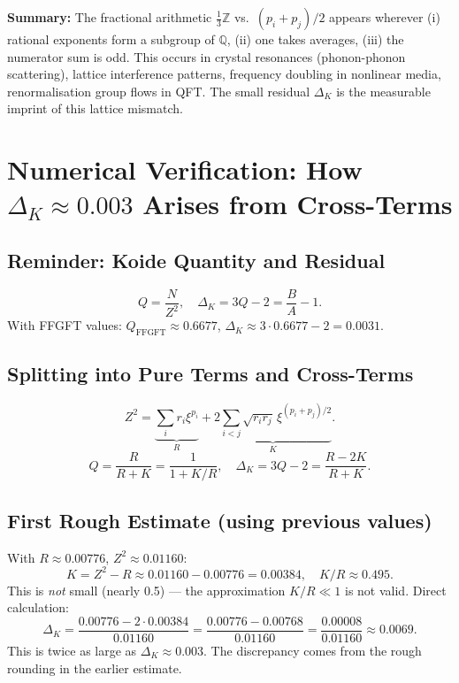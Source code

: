 \medskip\noindent
\textbf{Summary:} The fractional arithmetic $\tfrac{1}{3}\mathbb{Z}$
vs.\ $(p_i+p_j)/2$
appears wherever (i) rational exponents form a subgroup of $\mathbb{Q}$,
(ii) one takes averages, (iii) the numerator sum is odd.
This occurs in crystal resonances (phonon-phonon scattering),
lattice interference patterns, frequency doubling in nonlinear media,
renormalisation group flows in QFT.
The small residual $\Delta_K$ is the measurable imprint of this lattice mismatch.

\section{Numerical Verification: How $\Delta_K\approx0.003$ Arises from Cross-Terms}


\subsection{Reminder: Koide Quantity and Residual}

\[
  Q=\frac{N}{Z^2}, \quad \Delta_K=3Q-2=\frac{B}{A}-1.
\]
With FFGFT values: $Q_{\text{FFGFT}}\approx0.6677$,
$\Delta_K\approx3\cdot0.6677-2=0.0031$.

\subsection{Splitting into Pure Terms and Cross-Terms}

\[
  Z^2 = \underbrace{\sum_ir_i\xi^{p_i}}_{R}
      + \underbrace{2\sum_{i<j}\sqrt{r_ir_j}\,\xi^{(p_i+p_j)/2}}_{K}.
\]
\[
  Q=\frac{R}{R+K}=\frac{1}{1+K/R}, \quad
  \Delta_K=3Q-2=\frac{R-2K}{R+K}.
\]

\subsection{First Rough Estimate (using previous values)}

With $R\approx0.00776$, $Z^2\approx0.01160$:
\[
  K=Z^2-R\approx0.01160-0.00776=0.00384, \quad K/R\approx0.495.
\]
This is \emph{not} small (nearly 0.5) --- the approximation $K/R\ll1$ is not valid.
Direct calculation:
\[
  \Delta_K=\frac{0.00776-2\cdot0.00384}{0.01160}
  =\frac{0.00776-0.00768}{0.01160}
  =\frac{0.00008}{0.01160}\approx0.0069.
\]
This is twice as large as $\Delta_K\approx0.003$.
The discrepancy comes from the rough rounding in the earlier estimate.

